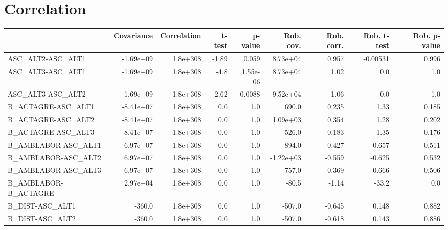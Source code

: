 \section{Correlation}
\begin{tabular}{lrrrrrrrr}
\toprule
{} &  Covariance &  Correlation &   t-test &  p-value &  Rob. cov. &  Rob. corr. &  Rob. t-test &  Rob. p-value \\
\midrule
ASC\_ALT2-ASC\_ALT1                 &   -1.69e+09 &     1.8e+308 &    -1.89 &    0.059 &   8.73e+04 &       0.957 &     -0.00531 &         0.996 \\
ASC\_ALT3-ASC\_ALT1                 &   -1.69e+09 &     1.8e+308 &     -4.8 & 1.55e-06 &   8.73e+04 &        1.02 &          0.0 &           1.0 \\
ASC\_ALT3-ASC\_ALT2                 &   -1.69e+09 &     1.8e+308 &    -2.62 &   0.0088 &   9.52e+04 &        1.06 &          0.0 &           1.0 \\
B\_ACTAGRE-ASC\_ALT1                &   -8.41e+07 &     1.8e+308 &      0.0 &      1.0 &      690.0 &       0.235 &         1.33 &         0.185 \\
B\_ACTAGRE-ASC\_ALT2                &   -8.41e+07 &     1.8e+308 &      0.0 &      1.0 &   1.09e+03 &       0.354 &         1.28 &         0.202 \\
B\_ACTAGRE-ASC\_ALT3                &   -8.41e+07 &     1.8e+308 &      0.0 &      1.0 &      526.0 &       0.183 &         1.35 &         0.176 \\
B\_AMBLABOR-ASC\_ALT1               &    6.97e+07 &     1.8e+308 &      0.0 &      1.0 &     -894.0 &      -0.427 &       -0.657 &         0.511 \\
B\_AMBLABOR-ASC\_ALT2               &    6.97e+07 &     1.8e+308 &      0.0 &      1.0 &  -1.22e+03 &      -0.559 &       -0.625 &         0.532 \\
B\_AMBLABOR-ASC\_ALT3               &    6.97e+07 &     1.8e+308 &      0.0 &      1.0 &     -757.0 &      -0.369 &       -0.666 &         0.506 \\
B\_AMBLABOR-B\_ACTAGRE              &    2.97e+04 &     1.8e+308 &      0.0 &      1.0 &      -80.5 &       -1.14 &        -33.2 &           0.0 \\
B\_DIST-ASC\_ALT1                   &      -360.0 &     1.8e+308 &      0.0 &      1.0 &     -507.0 &      -0.645 &        0.148 &         0.882 \\
B\_DIST-ASC\_ALT2                   &      -360.0 &     1.8e+308 &      0.0 &      1.0 &     -507.0 &      -0.618 &        0.143 &         0.886 \\

\end{tabular}
